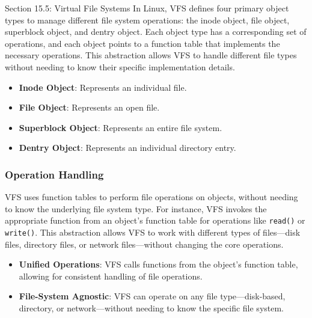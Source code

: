 \begin{notes}{Section 15.5: Virtual File Systems}
    In Linux, VFS defines four primary object types to manage different file system operations: the inode object, file object, superblock object, and dentry object. Each object type has a corresponding 
    set of operations, and each object points to a function table that implements the necessary operations. This abstraction allows VFS to handle different file types without needing to know their 
    specific implementation details.
    
    \begin{highlight}
    
        \begin{itemize}
            \item \textbf{Inode Object}: Represents an individual file.
            \item \textbf{File Object}: Represents an open file.
            \item \textbf{Superblock Object}: Represents an entire file system.
            \item \textbf{Dentry Object}: Represents an individual directory entry.
        \end{itemize}
    
    \end{highlight}
    
    \subsubsection*{Operation Handling}
    
    VFS uses function tables to perform file operations on objects, without needing to know the underlying file system type. For instance, VFS invokes the appropriate function from an object's function 
    table for operations like \texttt{read()} or \texttt{write()}. This abstraction allows VFS to work with different types of files—disk files, directory files, or network files—without changing the 
    core operations.
    
    \begin{highlight}
    
        \begin{itemize}
            \item \textbf{Unified Operations}: VFS calls functions from the object's function table, allowing for consistent handling of file operations.
            \item \textbf{File-System Agnostic}: VFS can operate on any file type—disk-based, directory, or network—without needing to know the specific file system.
        \end{itemize}
    

\end{highlight}
\end{notes}
